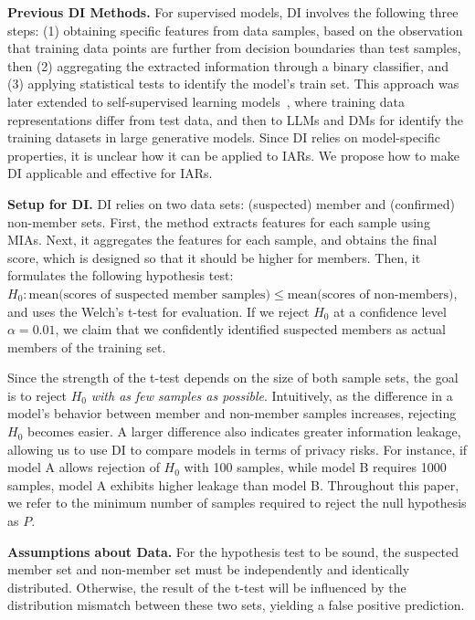 \textbf{Previous DI Methods.} For supervised models, DI involves the following three steps: (1) obtaining specific features from data samples, based on the observation that training data points are further from decision boundaries than test samples, then (2) aggregating the extracted information through a binary classifier, and (3) applying statistical tests to identify the model's train set.
This approach was later extended to self-supervised learning models~\citep{datasetinference2022neurips}, where training data representations differ from test data, and then to LLMs \citep{maini2024llmdatasetinferencedid} and DMs \cite{dubinski2024cdicopyrighteddataidentification} for identify the training datasets in large generative models. 
Since DI relies on model-specific properties, it is unclear how it can be applied to IARs. We propose how to make DI applicable and effective for IARs. 




\textbf{Setup for DI.}  
DI relies on two data sets: (suspected) member and (confirmed) non-member sets. First, the method extracts features for each sample using MIAs. Next, it aggregates the features for each sample, and obtains the final score, which is designed so that it should be higher for members. Then, it formulates the following hypothesis test: $H_0:\text{mean(scores of suspected member samples)}\leq\text{mean(scores of non-members)}$, and uses the Welch's t-test for evaluation. If we reject $H_0$ at a confidence level $\alpha=0.01$, we claim that we confidently identified suspected members as actual members of the training set. 

Since the strength of the t-test depends on the size of both sample sets, the goal is to reject \( H_0 \) \textit{with as few samples as possible}. Intuitively, as the difference in a model’s behavior between member and non-member samples increases, rejecting \( H_0 \) becomes easier. A larger difference also indicates greater information leakage, allowing us to use DI to compare models in terms of privacy risks. For instance, if model A allows rejection of \( H_0 \) with 100 samples, while model B requires 1000 samples, model A exhibits higher leakage than model B. Throughout this paper, we refer to the minimum number of samples required to reject the null hypothesis as \( P \).

\textbf{Assumptions about Data.} For the hypothesis test to be sound, the suspected member set and non-member set must be independently and identically distributed. Otherwise, the result of the t-test will be influenced by the distribution mismatch between these two sets, yielding a false positive prediction.


